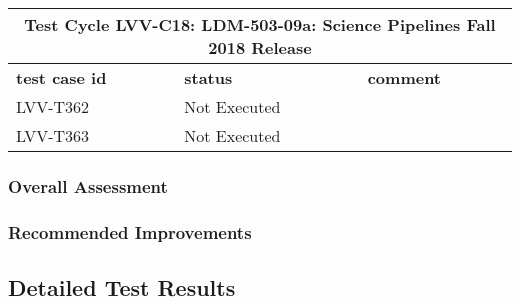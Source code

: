 \documentclass[DM,lsstdraft,STR,toc]{lsstdoc}
\begin{document}
\begin{longtable} {p{}p{}p{}}
\toprule
\multicolumn{3}{c}{ Test Cycle {\bf LVV-C18: LDM-503-09a: Science Pipelines Fall 2018 Release }} \\\hline
{\bf \footnotesize test case id} & {\bf \footnotesize status} & {\bf \footnotesize comment} \\\toprule
LVV-T362 & Not Executed &  \\\hline
LVV-T363 & Not Executed &  \\\hline
\end{longtable}

\subsubsection{Overall Assessment}
\label{sect:overallassessment}


\subsubsection{Recommended Improvements}
\label{sect:recommendations}

\subsection{Detailed Test Results}
\label{sect:detailedtestresults}
\end{document}
